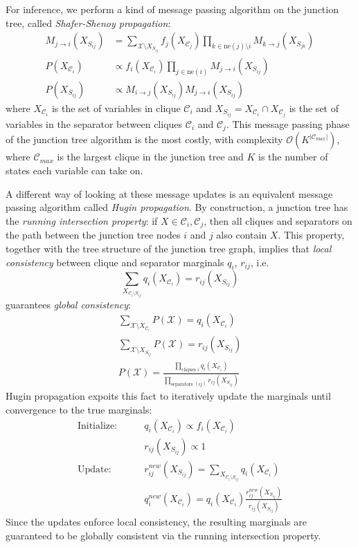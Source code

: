 \documentclass[a4paper]{article}
\begin{document}
For inference, we perform a kind of message passing algorithm on the junction tree, called \emph{Shafer-Shenoy propagation}:
\begin{align*}
M_{j\rightarrow i}(X_{S_{ij}}) &= \sum_{\mathcal{X}\setminus X_{S_{ij}}} f_j(X_{\mathcal{C}_j}) \prod_{k\in\textrm{ne}(j)\setminus i} M_{k\rightarrow j}(X_{S_{jk}}) \\
P(X_{\mathcal{C}_i}) &\propto f_i(X_{\mathcal{C}_i}) \prod_{j\in\textrm{ne}(i)} M_{j\rightarrow i}(X_{S_{ij}}) \\
P(X_{S_{ij}}) &\propto M_{i\rightarrow j}(X_{S_{ij}}) M_{j\rightarrow i}(X_{S_{ij}})
\end{align*}
where $X_{\mathcal{C}_i}$ is the set of variables in clique $\mathcal{C}_i$ and $X_{S_{ij}}=X_{\mathcal{C}_i} \cap X_{\mathcal{C}_j}$ is the set of variables in the separator between cliques $\mathcal{C}_i$ and $\mathcal{C}_j$. This message passing phase of the junction tree algorithm is the most costly, with complexity $\mathcal{O}\left(K^{|\mathcal{C}_{max}|}\right)$, where $\mathcal{C}_{max}$ is the largest clique in the junction tree and $K$ is the number of states each variable can take on.

A different way of looking at these message updates is an equivalent message passing algorithm called \emph{Hugin propagation}. By construction, a junction tree has the \emph{running intersection property}: if $X\in\mathcal{C}_i,\mathcal{C}_j$, then all cliques and separators on the path between the junction tree nodes $i$ and $j$ also contain $X$. This property, together with the tree structure of the junction tree graph, implies that \emph{local consistency} between clique and separator marginals $q_i$, $r_{ij}$, i.e.
\[ \sum_{X_{\mathcal{C}_i\setminus S_{ij}}} q_i(X_{\mathcal{C}_i}) = r_{ij}(X_{S_{ij}}) \]
guarantees \emph{global consistency}:
\begin{gather*}
\sum_{\mathcal{X}\setminus X_{\mathcal{C}_i}} P(\mathcal{X}) = q_i(X_{\mathcal{C}_i}) \\
\sum_{\mathcal{X}\setminus X_{S_{ij}}} P(\mathcal{X}) = r_{ij}(X_{S_{ij}}) \\
P(\mathcal{X}) = \frac{\prod_{\textrm{cliques } i}q_i(X_{\mathcal{C}_i})}{\prod_{\textrm{separators } (ij)}r_{ij}(X_{S_{ij}})}
\end{gather*}
Hugin propagation expoits this fact to iteratively update the marginals until convergence to the true marginals:
\begin{align*}
\text{Initialize:} \quad\quad &q_i(X_{\mathcal{C}_i}) \propto f_i(X_{\mathcal{C}_i}) \\
&r_{ij}(X_{S_{ij}}) \propto 1 \\
\text{Update:} \quad\quad &r_{ij}^{new}(X_{S_{ij}}) = \sum_{X_{\mathcal{C}_i\setminus S_{ij}}} q_i(X_{\mathcal{C}_i}) \\
&q_i^{new}(X_{\mathcal{C}_i}) = q_i(X_{\mathcal{C}_i}) \frac{r_{ij}^{new}(X_{S_{ij}})}{r_{ij}(X_{S_{ij}})}
\end{align*}
Since the updates enforce local consistency, the resulting marginals are guaranteed to be globally consistent via the running intersection property.
\end{document}
